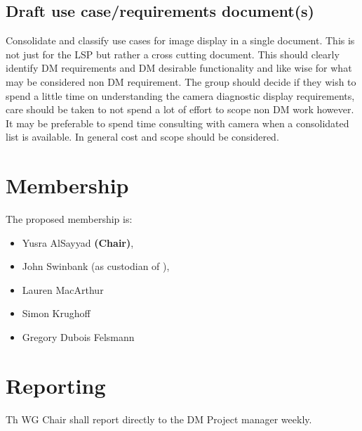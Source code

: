 \subsection{Draft use case/requirements document(s)}
Consolidate and classify use cases for image display in a single document. This is not just for the \gls{LSP} but rather a cross cutting document. This should clearly identify \gls{DM} requirements and \gls{DM} desirable functionality and like wise for what may be considered non \gls{DM} requirement.
The group should decide if they wish to spend a little time on understanding the camera diagnostic display requirements, care should be taken to not spend a lot of effort to scope non \gls{DM} work however. It may be preferable to spend time consulting with camera when a consolidated list is available.
In general cost and scope should be considered.


\section{Membership}

The proposed membership is:

\begin{itemize}
  \item Yusra AlSayyad \textbf{(Chair)},
  \item John Swinbank (as custodian of ),
  \item Lauren MacArthur
  \item Simon Krughoff
  \item Gregory Dubois Felsmann
\end{itemize}

\section{Reporting}

Th \gls{WG} Chair shall report directly to the \gls{DM} Project manager weekly.

